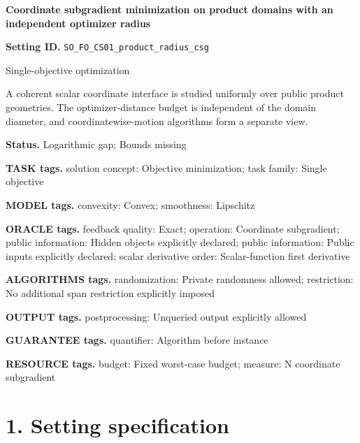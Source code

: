 \documentclass[10pt,a4paper]{article}
\begin{document}
\raggedright

{\LARGE\bfseries\sffamily\color{AtlasNavy} Coordinate subgradient minimization on product domains with an independent optimizer radius\par}\vspace{5pt}


\textbf{Setting ID.} \texttt{SO\_\allowbreak{}FO\_\allowbreak{}CS01\_\allowbreak{}product\_\allowbreak{}radius\_\allowbreak{}csg}



Single-objective optimization



A coherent scalar coordinate interface is studied uniformly over public product geometries. The optimizer-distance budget is independent of the domain diameter, and coordinatewise-motion algorithms form a separate view.



\textbf{Status.} Logarithmic gap; Bounds missing



\textbf{TASK tags.} solution concept: Objective minimization; task family: Single objective



\textbf{MODEL tags.} convexity: Convex; smoothness: Lipschitz



\textbf{ORACLE tags.} feedback quality: Exact; operation: Coordinate subgradient; public information: Hidden objects explicitly declared; public information: Public inputs explicitly declared; scalar derivative order: Scalar-function first derivative



\textbf{ALGORITHMS tags.} randomization: Private randomness allowed; restriction: No additional span restriction explicitly imposed



\textbf{OUTPUT tags.} postprocessing: Unqueried output explicitly allowed



\textbf{GUARANTEE tags.} quantifier: Algorithm before instance



\textbf{RESOURCE tags.} budget: Fixed worst-case budget; measure: N coordinate subgradient



\section{1. Setting specification}
\end{document}
